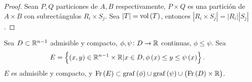 \begin{proof}
    Sean $P, Q$ particiones de $A, B$ respectivamente, $P\times Q$ es una partición de $A\times B$ con subrectángulos $R_i \times S_j$. Sea $|T| = \operatorname{vol}\left( T\right)$, entonces $|R_i\times S_j| = |R_i||S_j|$.
\end{proof}
\begin{lema}
    Sea $D \subset \mathbb{R}^{n-1}$ admisible y compacto, $\phi, \psi \colon D \to \mathbb{R}$ continuas, $\phi \leq \psi$. Sea
    \[ E = \left\{\left( x,y\right) \in \mathbb{R}^{n-1} \times \mathbb{R} | x\in D, \phi\left( x\right) \leq y \leq \psi\left( x\right) \right\}. \]
    $E$ es admisible y compacto, y $\operatorname{Fr}\left( E\right) \subset \operatorname{graf}\left(\phi\right) \cup \operatorname{graf}\left(\psi\right)\cup\left( \operatorname{Fr}\left( D\right)\times\mathbb{R}\right)$.
\end{lema}
